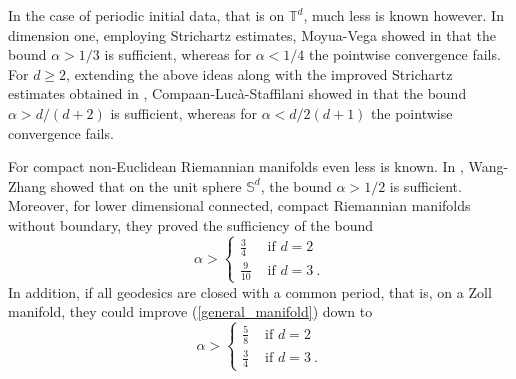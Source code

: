 \documentclass[12pt]{amsart}
\theoremstyle{definition}
\newcommand{\Sb}{\mathbb S}%
\newcommand{\T}{\mathbb T}%
\numberwithin{equation}{section}
\begin{document}
\medskip

In the case of periodic initial data, that is on $\T^d$, much less is known however. In dimension one, employing Strichartz estimates, Moyua-Vega showed in \cite{MV} that the bound $\alpha > 1/3$ is sufficient, whereas for $\alpha <1/4$ the pointwise convergence fails. For $d \ge 2$, extending the above ideas along with the improved Strichartz estimates obtained in \cite{BD}, Compaan-Luc\`a-Staffilani showed in \cite{CLS} that the bound $\alpha>d/(d+2)$ is sufficient, whereas for $\alpha <d/2(d+1)$ the pointwise convergence fails.

\medskip 

For compact non-Euclidean Riemannian manifolds even less is known. In \cite{WZ}, Wang-Zhang showed that on the unit sphere $\Sb^d$, the bound $\alpha>1/2$ is sufficient. Moreover, for lower dimensional connected, compact Riemannian manifolds without boundary, they proved the sufficiency of the bound
\begin{equation} \label{general_manifold}
\alpha > 
\begin{cases}
	 \frac{3}{4} &\text{ if } d=2 \\
	\frac{9}{10} &\text{ if } d=3\:.
	\end{cases}
\end{equation}
In addition, if all geodesics are closed with a common period, that is, on a Zoll manifold, they could improve (\ref{general_manifold}) down to
\begin{equation} \label{zoll_manifold}
\alpha > 
\begin{cases}
	 \frac{5}{8} &\text{ if } d=2 \\
	\frac{3}{4} &\text{ if } d=3\:.
	\end{cases}
\end{equation}
\end{document}
